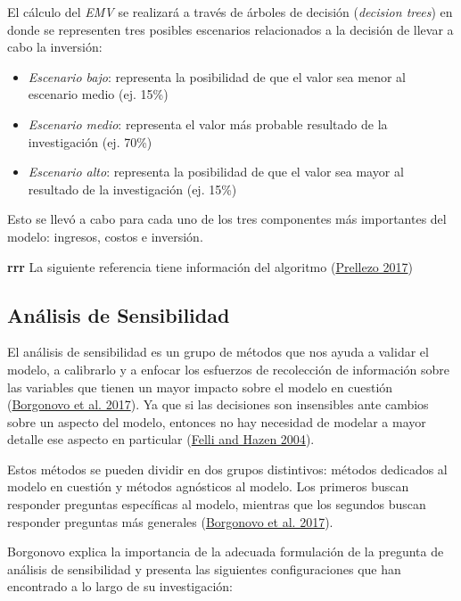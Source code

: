 \documentclass[
]{book}
\providecommand{\tightlist}{%
  \setlength{\itemsep}{0pt}\setlength{\parskip}{0pt}}
\begin{document}
El cálculo del \emph{EMV} se realizará a través de árboles de decisión (\emph{decision trees}) en donde se representen tres posibles escenarios relacionados a la decisión de llevar a cabo la inversión:

\begin{itemize}
\tightlist
\item
  \emph{Escenario bajo}: representa la posibilidad de que el valor sea menor al escenario medio (ej. 15\%)
\item
  \emph{Escenario medio}: representa el valor más probable resultado de la investigación (ej. 70\%)
\item
  \emph{Escenario alto}: representa la posibilidad de que el valor sea mayor al resultado de la investigación (ej. 15\%)
\end{itemize}

Esto se llevó a cabo para cada uno de los tres componentes más importantes del modelo: ingresos, costos e inversión.

\textbf{rrr} La siguiente referencia tiene información del algoritmo (\protect\hyperlink{ref-Prellezo2017}{Prellezo 2017})

\hypertarget{anuxe1lisis-de-sensibilidad}{%
\subsection{Análisis de Sensibilidad}\label{anuxe1lisis-de-sensibilidad}}

El análisis de sensibilidad es un grupo de métodos que nos ayuda a validar el modelo, a calibrarlo y a enfocar los esfuerzos de recolección de información sobre las variables que tienen un mayor impacto sobre el modelo en cuestión (\protect\hyperlink{ref-Borgonovo2017}{Borgonovo et al. 2017}). Ya que si las decisiones son insensibles ante cambios sobre un aspecto del modelo, entonces no hay necesidad de modelar a mayor detalle ese aspecto en particular (\protect\hyperlink{ref-Felli2004}{Felli and Hazen 2004}).

Estos métodos se pueden dividir en dos grupos distintivos: métodos dedicados al modelo en cuestión y métodos agnósticos al modelo. Los primeros buscan responder preguntas específicas al modelo, mientras que los segundos buscan responder preguntas más generales (\protect\hyperlink{ref-Borgonovo2017}{Borgonovo et al. 2017}).

Borgonovo explica la importancia de la adecuada formulación de la pregunta de análisis de sensibilidad y presenta las siguientes configuraciones que han encontrado a lo largo de su investigación:
\end{document}
